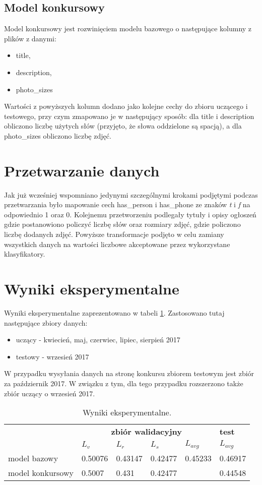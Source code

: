 \documentclass[a4paper,11pt]{article}
\begin{document}
\subsection{Model konkursowy}

Model konkursowy jest rozwinięciem modelu bazowego o następujące kolumny z plików z danymi:
\begin{itemize}
\item title,
\item description,
\item photo\_sizes
\end{itemize}

Wartości z powyższych kolumn dodano jako kolejne cechy do zbioru uczącego i testowego, przy czym zmapowano je w następujący sposób: dla title i description obliczono liczbę użytych słów (przyjęto, że słowa oddzielone są spacją), a dla photo\_sizes obliczono liczbę zdjęć.

\section{Przetwarzanie danych}

Jak już wcześniej wspomniano jedynymi szczególnymi krokami podjętymi podczas przetwarzania było mapowanie cech has\_person i has\_phone ze znaków \textit{t} i \textit{f} na odpowiednio 1 oraz 0. Kolejnemu przetworzeniu podlegały tytuły i opisy ogłoszeń gdzie postanowiono policzyć liczbę słów oraz rozmiary zdjęć, gdzie policzono liczbę dodanych zdjęć. Powyższe transformacje podjęto w celu zamiany wszystkich danych na wartości liczbowe akceptowane przez wykorzystane klasyfikatory.

\section{Wyniki eksperymentalne}

Wyniki eksperymentalne zaprezentowano w tabeli \ref{tab:problem_1}. Zastosowano tutaj następujące zbiory danych:
\begin{itemize}
\item uczący - kwiecień, maj, czerwiec, lipiec, sierpień 2017
\item testowy - wrzesień 2017
\end{itemize}
W przypadku wysyłania danych na stronę konkursu zbiorem testowym jest zbiór za październik 2017. W związku z tym, dla tego przypadku rozszerzono także zbiór uczący o wrzesień 2017.

\begin{table}[!ht]
\begin{center}
\begin{tabular}{l|llll|l}
  & \multicolumn{4}{c|}{\textbf{zbiór walidacyjny}} & \textbf{test} \\
  &   $L_{v}$   & $L_{r}$    &  $L_{s}$   & $L_{avg}$    & $L_{avg}$ \\
  \hline
model bazowy  & 0.50076 & 0.43147 &  0.42477 & 0.45233 & 0.46917 \\
model konkursowy & 0.5007 & 0.431 &  0.42477 & & 0.44548
\end{tabular}
\end{center}
\caption{Wyniki eksperymentalne.}
\label{tab:problem_1}
\end{table}
\end{document}
